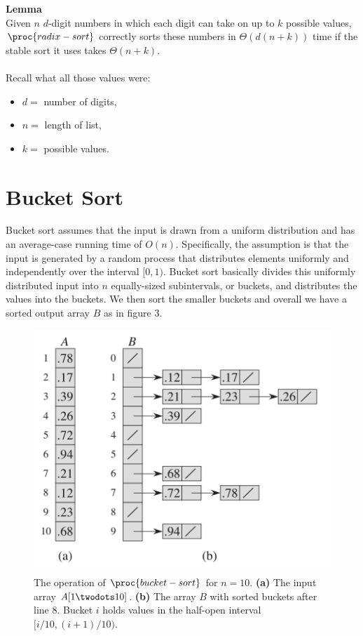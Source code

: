 \documentclass[12pt]{article}
\begin{document}
\textbf{Lemma} \\
Given $n$ $d$-digit numbers in which each digit can take on up to $k$ possible values, $\proc{radix-sort}$ correctly sorts these numbers in $\Theta{(d(n + k))}$ time if the stable sort it uses takes $\Theta{(n + k)}$.
\\ \\
Recall what all those values were:\\
\begin{itemize}
    \item[] $d=$ number of digits,
    \item[] $n=$ length of list,
    \item[] $k=$ possible values.
\end{itemize}


\newpage

\section*{Bucket Sort}
Bucket sort assumes that the input is drawn from a uniform distribution and has an average-case running time of $O(n)$. Specifically, the assumption is that the input is generated by a random process that distributes elements uniformly and independently over the interval $[0, 1)$. Bucket sort basically divides this uniformly distributed input into $n$ equally-sized subintervals, or buckets, and distributes the values into the buckets. We then sort the smaller buckets and overall we have a sorted output array $B$ as in figure 3.

\begin{figure}[!ht]
\includegraphics[scale=0.3]{bucket_sort}
\caption{
    The operation of $\proc{bucket-sort}$ for $n=10$. 
    \textbf{(a)} The input array $A[1 \twodots 10]$.
    \textbf{(b)} The array $B$ with sorted buckets after line 8. Bucket $i$ holds values in the half-open interval $[i/10, (i+1)/10)$.
}
\label{fig:linear_bs}
\end{figure}
\end{document}
